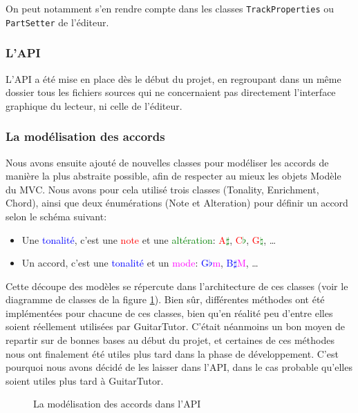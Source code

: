 On peut notamment s'en rendre compte dans les classes \texttt{TrackProperties} ou \texttt{PartSetter} de l'éditeur.
\subsubsection{L'\ac{API}}

L'\ac{API} a été mise en place dès le début du projet, en regroupant dans un même dossier tous les fichiers sources qui ne concernaient pas directement l'interface graphique du lecteur, ni celle de l'éditeur.

\subsubsection*{La modélisation des accords}

Nous avons ensuite ajouté de nouvelles classes pour modéliser les accords de manière la plus abstraite possible, afin de respecter au mieux les objets Modèle du \ac{MVC}. Nous avons pour cela utilisé trois classes (Tonality, Enrichment, Chord), ainsi que deux énumérations (Note et Alteration) pour définir un accord selon le schéma suivant:
\begin{itemize}
 \item Une \textcolor{blue}{tonalité}, c'est une \textcolor{red}{note} et une \textcolor{green}{altération}: \textcolor{red}{A}\textcolor{green}{$\sharp$}, \textcolor{red}{C}\textcolor{green}{$\flat$}, \textcolor{red}{G}\textcolor{green}{$\natural$}, \dots
 \item Un accord, c'est une \textcolor{blue}{tonalité} et un \textcolor{magenta}{mode}: \textcolor{blue}{G$\flat$}\textcolor{magenta}{m}, \textcolor{blue}{B$\sharp$}\textcolor{magenta}{M}, \dots
\end{itemize}

Cette découpe des modèles se répercute dans l'architecture de ces classes (voir le diagramme de classes de la figure \ref{diag_api_chords}). Bien sûr, différentes méthodes ont été implémentées pour chacune de ces classes, bien qu'en réalité peu d'entre elles soient réellement utilisées par GuitarTutor. C'était néanmoins un bon moyen de repartir sur de bonnes bases au début du projet, et certaines de ces méthodes nous ont finalement été utiles plus tard dans la phase de développement. C'est pourquoi nous avons décidé de les laisser dans l'\ac{API}, dans le cas probable qu'elles soient utiles plus tard à GuitarTutor.

\begin{figure}[H]
\begin{center}
\caption{La modélisation des accords dans l'\ac{API}}
\label{diag_api_chords}
\end{center}
\end{figure}

